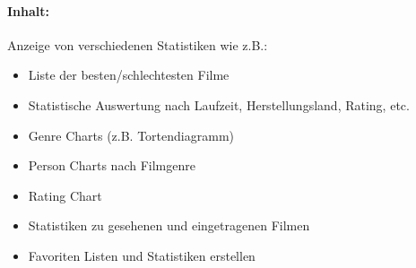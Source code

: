 \documentclass[11pt]{scrreprt}
\begin{document}
\paragraph{Inhalt:}
Anzeige von verschiedenen Statistiken wie z.B.:
\begin{itemize}
\item Liste der besten/schlechtesten Filme
\item Statistische Auswertung nach Laufzeit, Herstellungsland, Rating, etc.
\item Genre Charts (z.B. Tortendiagramm)
\item Person Charts nach Filmgenre
\item Rating Chart
\item Statistiken zu gesehenen und eingetragenen Filmen
\item Favoriten Listen und Statistiken erstellen  
\end{itemize}
\end{document}
